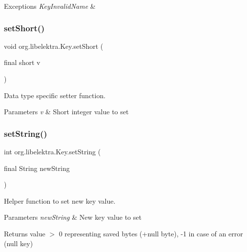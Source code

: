 \begin{DoxyExceptions}{Exceptions}
{\em Key\+Invalid\+Name} & \\
\hline
\end{DoxyExceptions}
\mbox{\label{classorg_1_1libelektra_1_1Key_ac1621a8d43992b40b6b20a0e45182376}} 
\subsubsection{\texorpdfstring{set\+Short()}{setShort()}}
{\footnotesize\ttfamily void org.\+libelektra.\+Key.\+set\+Short (\begin{DoxyParamCaption}\item[{final short}]{v }\end{DoxyParamCaption})\hspace{0.3cm}{\ttfamily [inline]}}



Data type specific setter function. 


\begin{DoxyParams}{Parameters}
{\em v} & Short integer value to set \\
\hline
\end{DoxyParams}
\mbox{\label{classorg_1_1libelektra_1_1Key_a5ccfaddf110c47c83686655a694ee76d}} 
\subsubsection{\texorpdfstring{set\+String()}{setString()}}
{\footnotesize\ttfamily int org.\+libelektra.\+Key.\+set\+String (\begin{DoxyParamCaption}\item[{final String}]{new\+String }\end{DoxyParamCaption})\hspace{0.3cm}{\ttfamily [inline]}}



Helper function to set new key value. 


\begin{DoxyParams}{Parameters}
{\em new\+String} & New key value to set \\
\hline
\end{DoxyParams}
\begin{DoxyReturn}{Returns}
value $>$ 0 representing saved bytes (+null byte), -\/1 in case of an error (null key) 
\end{DoxyReturn}
\mbox{\label{classorg_1_1libelektra_1_1Key_a2814202c93e4f4dac842b2d4856ba78e}} 
